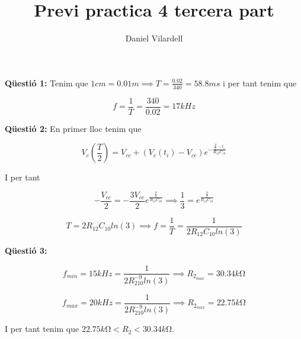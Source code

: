\documentclass[12pt, a4papre]{article}
\author{Daniel Vilardell}
\title{Previ practica 4 tercera part}
\date{}
\begin{document}
	\maketitle
	
	\textbf{Qüestió 1:} Tenim que $1cm = 0.01m \implies T = \frac{0.02}{340} = 58.8ms$ i per tant tenim que
	
	\[
		f = \frac{1}{T} = \frac{340}{0.02} = 17kHz
	\]
	
	\textbf{Qüestió 2:}  En primer lloc tenim que
	
	\[
		V_c(\frac{T}{2}) = V_{cc} + (V_c(t_i)-V_{cc})e^{-\frac{\frac{T}{2}-t_i}{R_{12}C_{10}}}
	\]
	
	I per tant
	
	\[
		-\frac{V_{cc}}{2} = -\frac{3V_{cc}}{2}e^{\frac{\frac{T}{2}}{R_{12}C_{10}}} \implies \frac{1}{3} = e^{\frac{\frac{T}{2}}{R_{12}C_{10}}}
	\]
	
	\[
		T = 2R_{12}C_{10}ln(3) \implies f = \frac{1}{T} = \frac{1}{2R_{12}C_{10}ln(3)}
	\]
	
	\textbf{Qüestió 3:} 
	
	\[
		f_{min} = 15kHz = \frac{1}{2R_210^{-9}ln(3)} \implies R_{2_{max}} = 30.34k\si{\ohm}
	\]
	
	\[
		f_{max} = 20kHz = \frac{1}{2R_210^{-9}ln(3)} \implies R_{2_{max}} = 22.75k\si{\ohm}
	\]
	
	I per tant tenim que $22.75k\si{\ohm} < R_2 < 30.34k\si{\ohm}$.
	
\end{document}
